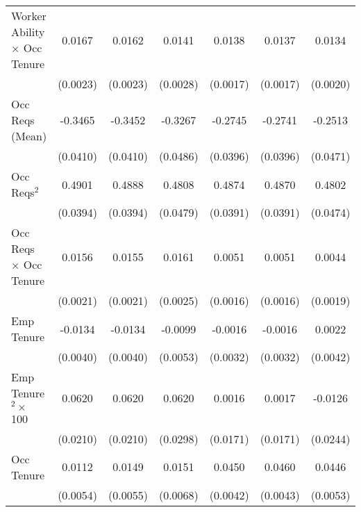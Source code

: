 {\begin{longtable}{l*{6}{c}}
Worker Ability $\times$ Occ Tenure&      0.0167\sym{***}&      0.0162\sym{***}&      0.0141\sym{***}&      0.0138\sym{***}&      0.0137\sym{***}&      0.0134\sym{***}\\
                    &    (0.0023)         &    (0.0023)         &    (0.0028)         &    (0.0017)         &    (0.0017)         &    (0.0020)         \\
Occ Reqs (Mean)     &     -0.3465\sym{***}&     -0.3452\sym{***}&     -0.3267\sym{***}&     -0.2745\sym{***}&     -0.2741\sym{***}&     -0.2513\sym{***}\\
                    &    (0.0410)         &    (0.0410)         &    (0.0486)         &    (0.0396)         &    (0.0396)         &    (0.0471)         \\
Occ Reqs$^2$        &      0.4901\sym{***}&      0.4888\sym{***}&      0.4808\sym{***}&      0.4874\sym{***}&      0.4870\sym{***}&      0.4802\sym{***}\\
                    &    (0.0394)         &    (0.0394)         &    (0.0479)         &    (0.0391)         &    (0.0391)         &    (0.0474)         \\
Occ Reqs $\times$ Occ Tenure&      0.0156\sym{***}&      0.0155\sym{***}&      0.0161\sym{***}&      0.0051\sym{***}&      0.0051\sym{***}&      0.0044\sym{**} \\
                    &    (0.0021)         &    (0.0021)         &    (0.0025)         &    (0.0016)         &    (0.0016)         &    (0.0019)         \\
Emp Tenure          &     -0.0134\sym{***}&     -0.0134\sym{***}&     -0.0099\sym{*}  &     -0.0016         &     -0.0016         &      0.0022         \\
                    &    (0.0040)         &    (0.0040)         &    (0.0053)         &    (0.0032)         &    (0.0032)         &    (0.0042)         \\
Emp Tenure$^2\times$ 100&      0.0620\sym{***}&      0.0620\sym{***}&      0.0620\sym{**} &      0.0016         &      0.0017         &     -0.0126         \\
                    &    (0.0210)         &    (0.0210)         &    (0.0298)         &    (0.0171)         &    (0.0171)         &    (0.0244)         \\
Occ Tenure          &      0.0112\sym{**} &      0.0149\sym{***}&      0.0151\sym{**} &      0.0450\sym{***}&      0.0460\sym{***}&      0.0446\sym{***}\\
                    &    (0.0054)         &    (0.0055)         &    (0.0068)         &    (0.0042)         &    (0.0043)         &    (0.0053)         \\

\end{longtable}}
